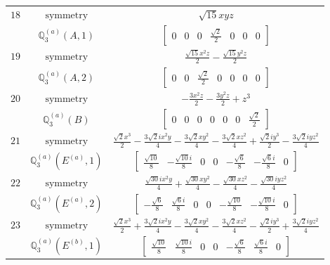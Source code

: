 \documentclass[fleqn,8pt,landscape]{jsarticle}
\begin{document}
\begin{longtable}{ccc}
$ 18 $ & $ \text{symmetry} $ & $ \sqrt{15} x y z $ \\
$  $ & $ \mathbb{Q}_{3}^{(a)}(A,1) $ & $ \begin{bmatrix} 0 & 0 & 0 & \frac{\sqrt{2}}{2} & 0 & 0 & 0 \end{bmatrix} $ \\ \hline
$ 19 $ & $ \text{symmetry} $ & $ \frac{\sqrt{15} x^{2} z}{2} - \frac{\sqrt{15} y^{2} z}{2} $ \\
$  $ & $ \mathbb{Q}_{3}^{(a)}(A,2) $ & $ \begin{bmatrix} 0 & 0 & \frac{\sqrt{2}}{2} & 0 & 0 & 0 & 0 \end{bmatrix} $ \\ \hline
$ 20 $ & $ \text{symmetry} $ & $ - \frac{3 x^{2} z}{2} - \frac{3 y^{2} z}{2} + z^{3} $ \\
$  $ & $ \mathbb{Q}_{3}^{(a)}(B) $ & $ \begin{bmatrix} 0 & 0 & 0 & 0 & 0 & 0 & \frac{\sqrt{2}}{2} \end{bmatrix} $ \\ \hline
$ 21 $ & $ \text{symmetry} $ & $ \frac{\sqrt{2} x^{3}}{2} - \frac{3 \sqrt{2} i x^{2} y}{4} - \frac{3 \sqrt{2} x y^{2}}{4} - \frac{3 \sqrt{2} x z^{2}}{4} + \frac{\sqrt{2} i y^{3}}{2} - \frac{3 \sqrt{2} i y z^{2}}{4} $ \\
$  $ & $ \mathbb{Q}_{3}^{(a)}(E^{(a)},1) $ & $ \begin{bmatrix} \frac{\sqrt{10}}{8} & - \frac{\sqrt{10} i}{8} & 0 & 0 & - \frac{\sqrt{6}}{8} & - \frac{\sqrt{6} i}{8} & 0 \end{bmatrix} $ \\ \hline
$ 22 $ & $ \text{symmetry} $ & $ \frac{\sqrt{30} i x^{2} y}{4} + \frac{\sqrt{30} x y^{2}}{4} - \frac{\sqrt{30} x z^{2}}{4} - \frac{\sqrt{30} i y z^{2}}{4} $ \\
$  $ & $ \mathbb{Q}_{3}^{(a)}(E^{(a)},2) $ & $ \begin{bmatrix} - \frac{\sqrt{6}}{8} & \frac{\sqrt{6} i}{8} & 0 & 0 & - \frac{\sqrt{10}}{8} & - \frac{\sqrt{10} i}{8} & 0 \end{bmatrix} $ \\ \hline
$ 23 $ & $ \text{symmetry} $ & $ \frac{\sqrt{2} x^{3}}{2} + \frac{3 \sqrt{2} i x^{2} y}{4} - \frac{3 \sqrt{2} x y^{2}}{4} - \frac{3 \sqrt{2} x z^{2}}{4} - \frac{\sqrt{2} i y^{3}}{2} + \frac{3 \sqrt{2} i y z^{2}}{4} $ \\
$  $ & $ \mathbb{Q}_{3}^{(a)}(E^{(b)},1) $ & $ \begin{bmatrix} \frac{\sqrt{10}}{8} & \frac{\sqrt{10} i}{8} & 0 & 0 & - \frac{\sqrt{6}}{8} & \frac{\sqrt{6} i}{8} & 0 \end{bmatrix} $ \\ \hline

\end{longtable}
\end{document}
